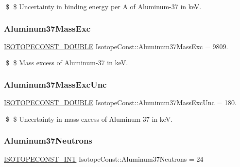 \$ \$ Uncertainty in binding energy per A of Aluminum-\/37 in keV. \mbox{\label{group___isotope_const-_aluminum-_al37_gaf48fd145d4b0966a5646215727ad4354}} 
\subsubsection{\texorpdfstring{Aluminum37\+Mass\+Exc}{Aluminum37MassExc}}
{\footnotesize\ttfamily \mbox{\hyperlink{group___isotope_const-_macros_ga8f45a7272ce02c0b4c65c44636ed719a}{I\+S\+O\+T\+O\+P\+E\+C\+O\+N\+S\+T\+\_\+\+D\+O\+U\+B\+LE}} Isotope\+Const\+::\+Aluminum37\+Mass\+Exc = 9809.}

\$ \$ Mass excess of Aluminum-\/37 in keV. \mbox{\label{group___isotope_const-_aluminum-_al37_ga596e9423a6bfb0b15d1b572e3cb8e5ed}} 
\subsubsection{\texorpdfstring{Aluminum37\+Mass\+Exc\+Unc}{Aluminum37MassExcUnc}}
{\footnotesize\ttfamily \mbox{\hyperlink{group___isotope_const-_macros_ga8f45a7272ce02c0b4c65c44636ed719a}{I\+S\+O\+T\+O\+P\+E\+C\+O\+N\+S\+T\+\_\+\+D\+O\+U\+B\+LE}} Isotope\+Const\+::\+Aluminum37\+Mass\+Exc\+Unc = 180.}

\$ \$ Uncertainty in mass excess of Aluminum-\/37 in keV. \mbox{\label{group___isotope_const-_aluminum-_al37_gab076502cb64ddf556aa4d756edd0e709}} 
\subsubsection{\texorpdfstring{Aluminum37\+Neutrons}{Aluminum37Neutrons}}
{\footnotesize\ttfamily \mbox{\hyperlink{group___isotope_const-_macros_ga5f18360b3e99483a35c32d789e62621c}{I\+S\+O\+T\+O\+P\+E\+C\+O\+N\+S\+T\+\_\+\+I\+NT}} Isotope\+Const\+::\+Aluminum37\+Neutrons = 24}

